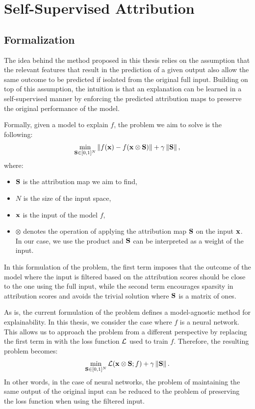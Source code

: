 \chapter{Self-Supervised Attribution} \label{ch:method}



\section{Formalization} \label{sec:problem}

The idea behind the method proposed in this thesis relies on the assumption that the relevant features that result in the prediction of a given output also allow the same outcome to be predicted if isolated from the original full input. Building on top of this assumption, the intuition is that an explanation can be learned in a self-supervised manner by enforcing the predicted attribution maps to preserve the original performance of the model.

Formally, given a model to explain $f$, the problem we aim to solve is the following:
\begin{equation} \label{eq:problem1}
    \min_{\S \in [0, 1]^{N}} \left\Vert f(\x) - f(\x \otimes \S) \right\Vert + \gamma \left\Vert \S \right\Vert,
\end{equation}
where:
\begin{itemize}
    \item $\S$ is the attribution map we aim to find,
    \item $N$ is the size of the input space,
    \item $\x$ is the input of the model $f$,
    \item $\otimes$ denotes the operation of applying the attribution map $\S$ on the input $\x$. In our case, we use the product and $\S$ can be interpreted as a weight of the input.
\end{itemize}
In this formulation of the problem, the first term imposes that the outcome of the model where the input is filtered based on the attribution scores should be close to the one using the full input, while the second term encourages sparsity in attribution scores and avoids the trivial solution where $\S$ is a matrix of ones.

As is, the current formulation of the problem defines a model-agnostic method for explainability. In this thesis, we consider the case where $f$ is a neural network. This allows us to approach the problem from a different perspective by replacing the first term in  with the loss function $\L$ used to train $f$. Therefore, the resulting problem becomes:
\begin{equation}
    \min_{\S \in [0, 1]^{N}} \L(\x \otimes \S; f) + \gamma \left\Vert \S \right\Vert.
\end{equation}
In other words, in the case of neural networks, the problem of maintaining the same output of the original input can be reduced to the problem of preserving the loss function when using the filtered input.



